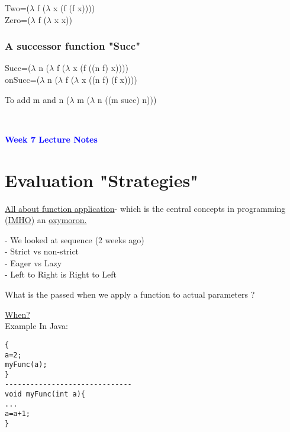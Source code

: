\documentclass{article}
\begin{document}
\begin{flushleft}
Two=($\lambda$ f ($\lambda$ x (f (f x))))\\
Zero=($\lambda$ f ($\lambda$ x x))\\
\end{flushleft}
	
\subsubsection*{A successor function "Succ"}
\begin{flushleft}
Succ=($\lambda$ n ($\lambda$ f ($\lambda$ x (f ((n f) x))))\\
onSucc=($\lambda$ n ($\lambda$ f ($\lambda$ x ((n f) (f x))))
\end{flushleft}

\begin{flushleft}
To add m and n ($\lambda$ m ($\lambda$ n ((m succ) n)))
\end{flushleft}
\noindent\makebox[\linewidth]{\rule{\paperwidth}{0.4pt}}\\
\vspace*{1.5cm}
\begin{flushleft}
\textcolor{blue}{\textbf{{\huge Week 7 Lecture Notes}}}
\section*{Evaluation "Strategies"}
\end{flushleft}
\begin{flushleft}
\underline{All about function application}- which is the central concepts in programming \underline{(IMHO)} an \underline{oxymoron.} 
\end{flushleft}

\doublespacing
\begin{flushleft}
- We looked at sequence (2 weeks ago)\\
- Strict vs non-strict\\
- Eager vs Lazy\\
- Left to Right is Right to Left\\
\end{flushleft}

\doublespacing
\begin{flushleft}
What is the passed when we apply a function to actual parameters ?
\end{flushleft}

\doublespacing
\begin{flushleft}
\underline{When?}\\
Example In Java: 
\begin{verbatim}
{ 
a=2;
myFunc(a);
}
------------------------------
void myFunc(int a){
...
a=a+1;
}
\end{verbatim}
\end{flushleft}
\end{document}
